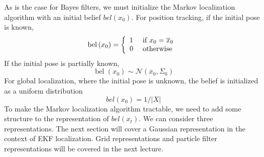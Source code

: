 \documentclass[twoside]{article}
\begin{document}
As is the case for Bayes filters, we must initialize the Markov localization algorithm with an initial belief $bel(x_0)$. For position tracking, if the initial pose is known,\\
\begin{equation}
    \operatorname { bel } \left( x _ { 0 } \right) = \left\{ \begin{array} { l l } { 1 } & { \text { if } x _ { 0 } = \overline { x } _ { 0 } } \\ { 0 } & { \text { otherwise } } \end{array} \right.
\end{equation}
If the initial pose is partially known,
\begin{equation}
    \operatorname { bel } \left( x _ { 0 } \right) \sim \mathcal { N } \left( \overline { x } _ { 0 } , \Sigma _ { 0 } \right)
\end{equation}
For global localization, where the initial pose is unknown, the belief is initialized as a uniform distribution
\begin{equation}
    b e l \left( x _ { 0 } \right) = 1 / | X |
\end{equation}
To make the Markov localization algorithm tractable, we need to add some structure to the representation of $bel(x_t)$. We can consider three representations. The next section will cover a Gaussian representation in
the context of EKF localization. Grid representations and particle filter representations will be covered in the next lecture.
\end{document}
